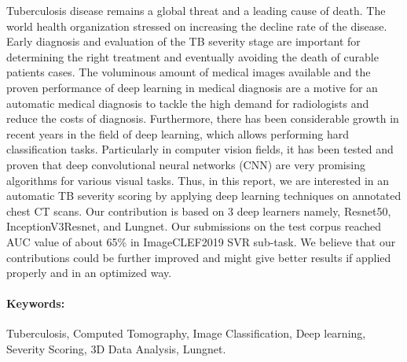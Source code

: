 Tuberculosis disease remains a global threat and a leading cause of death. The world health organization stressed on increasing the decline rate of the disease. Early diagnosis and evaluation of the TB severity stage are important for determining the right treatment and eventually avoiding the death of curable patients cases. The voluminous amount of medical images available and the proven performance of deep learning in medical diagnosis are a motive for an automatic medical diagnosis to tackle the high demand for radiologists and reduce the costs of diagnosis. Furthermore, there has been considerable growth in recent years in the field of deep learning, which allows performing hard classification tasks.  Particularly in computer vision fields, it has been tested and proven that deep convolutional neural networks (CNN) are very promising algorithms for various visual tasks. Thus, in this report, we are interested in an automatic TB severity scoring by applying deep learning techniques on annotated chest CT scans. Our contribution is based on 3 deep learners namely, Resnet50, InceptionV3Resnet, and Lungnet. Our submissions on the test corpus reached AUC value of about 65\% in ImageCLEF2019 SVR sub-task. We believe that our contributions could be further improved and might give better results if applied properly and in an optimized way.
\paragraph{Keywords:}Tuberculosis, Computed Tomography, Image Classification, Deep learning, Severity Scoring, 3D Data Analysis, Lungnet.